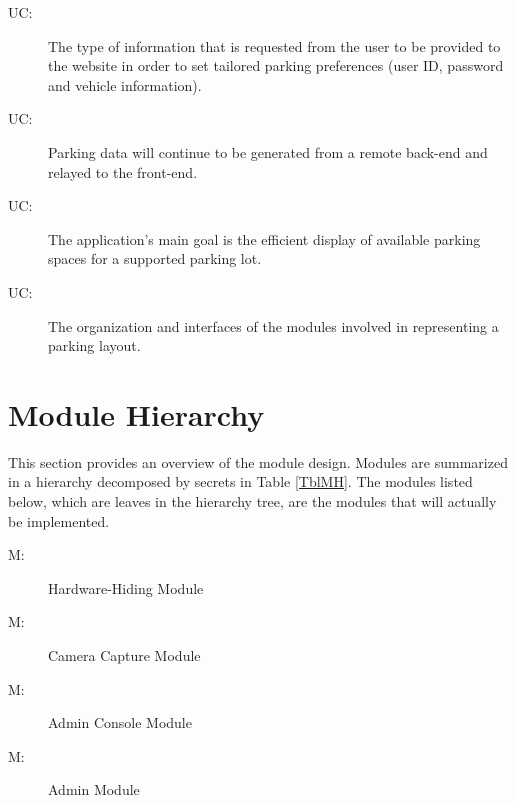 \documentclass[12pt, titlepage]{article}
\newcounter{ucnum}
\newcommand{\uctheucnum}{UC\theucnum}
\newcounter{mnum}
\newcommand{\mthemnum}{M\themnum}
\begin{document}
\begin{description}
\item[ \uctheucnum \label{ucIO}:] The type of information
that is requested from the user to be provided to the website in order to set
tailored parking preferences (user ID, password and vehicle information).

\item[ \uctheucnum \label{ucIO}:] Parking data will
continue to be generated from a remote back-end and relayed to the front-end.

\item[ \uctheucnum \label{ucIO}:] The application's main
goal is the efficient display of available parking spaces for a supported
parking lot.

\item[ \uctheucnum \label{ucData}:] The organization and
interfaces of the modules involved in representing a parking layout.
\end{description}

\section{Module Hierarchy} \label{SecMH}

This section provides an overview of the module design. Modules are summarized
in a hierarchy decomposed by secrets in Table \ref{TblMH}. The modules listed
below, which are leaves in the hierarchy tree, are the modules that will
actually be implemented.

\begin{description}
\item [ \mthemnum \label{mHH}:] Hardware-Hiding Module
\end{description}

\begin{description}
\item [ \mthemnum \label{mCameraCapture}:] Camera Capture
Module
\end{description}

\begin{description}
\item [ \mthemnum \label{mAdminConsole}:] Admin Console
Module
\end{description}

\begin{description}
\item [ \mthemnum \label{mAdmin}:] Admin Module
\end{description}
\end{document}
